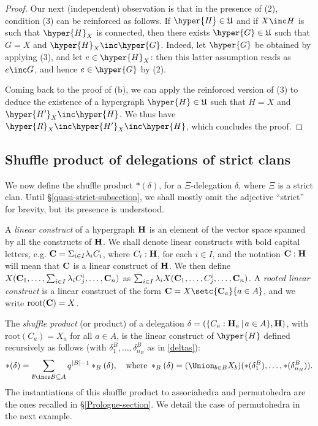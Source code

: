 \begin{proof}
Our next (independent) observation is that in the presence of (2), condition (3) can be reinforced as follows. If  $\hyper{H}\in\mathfrak{U}$ and if $X\inc H$ is such that $\hyper{H}_X$ is connected, then there exists $\hyper{G}\in\mathfrak{U}$ such that $G=X$ and $\hyper{H}_X\inc\hyper{G}$.  Indeed, let $\hyper{G}$ be obtained by applying (3), and let $e\in\hyper{H}_X$: then this latter assumption reads as $e\inc G$, and hence $e\in \hyper{G}$ by (2).

Coming back to the proof of (b), we can apply the reinforced version of (3) to deduce the existence of a hypergraph $\hyper{H}\in\mathfrak{U}$ such that
$H=X$ and $\hyper{H'}_X\inc\hyper{H}$. We thus have $\hyper{R}_X\inc\hyper{H'}_X\inc \hyper{H}$, which concludes the proof.
\end{proof}


 \subsection{Shuffle product of delegations of strict clans}\label{asp}
 
We now define the   shuffle product $\ast(\delta)$, for a $\Xi$-delegation $\delta$, where  $\Xi$ is a strict clan. Until \S\ref{quasi-strict-subsection}, we shall mostly omit  the adjective ``strict'' for brevity, but its presence is understood. 

A {\it linear construct} of a hypergraph ${\bf H}$ is an element of the vector space spanned by all the constructs of ${\bf H}$. We shall denote linear constructs with bold capital letters, e.g. ${\bf C}=\Sigma_{i\in I} {\lambda_i}C_i$, where $C_i:{\bf H}$, for each $i\in I$, and the notation ${\bf C}:{\bf H}$ will mean that ${\bf C}$ is a linear construct of ${\bf H}$.   We then define $X({\bf C}_1,\dots,\sum_{i\in I}\lambda_i C^i_{j},\dots,{\bf C}_n)$ as $\sum_{i\in I}\lambda_i X({\bf C}_1,\dots,C^i_{j},\dots,{\bf C}_n)$.  A {\em rooted linear construct} is a linear construct of the form  ${\bf C}=X\setc{{\bf C}_a}{a\in A}$, and we write $\mbox{root}({\bf C})=X$.

 The  {\it   shuffle product}  (or   product) of a  delegation $\delta=(\{C_a:{\bf H}_a\,|\, a\in A\},{\bf H})$, with $\mbox{root}(C_a)=X_a$ for all $a\in A$,  is  the  linear construct of  $\hyper{H}$ defined recursively as follows (with $\delta^B_1,\ldots, \delta^B_{n_{B}}$  as in \eqref{deltas}):
\begin{equation} \label{shuffle-def} 
\ast(\delta)= \sum_{\emptyset\incs B\subseteq A} q^{{|B|}-1}\ast_B(\delta), \quad \mbox{where}\;
\ast_B(\delta)=(\Union_{b\in B}X_b)(\ast(\delta^B_1),\dots,\ast(\delta^B_{n_{B}})).
\end{equation}
The instantiations of this shuffle product  to associahedra and permutohedra are  the ones recalled  in \S\ref{Prologue-section}. We detail the case of permutohedra in the next example.


